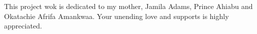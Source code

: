 
\begin{dedication} %
This project wok is dedicated to my mother, Jamila Adams, Prince Ahiabu and Okatachie Afrifa Amankwaa. Your unending love and supports is highly appreciated.  

\end{dedication}

